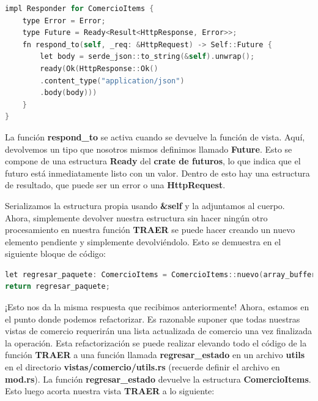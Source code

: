 \begin{lstlisting}[language=C]
impl Responder for ComercioItems {
	type Error = Error;
	type Future = Ready<Result<HttpResponse, Error>>;
	fn respond_to(self, _req: &HttpRequest) -> Self::Future {
		let body = serde_json::to_string(&self).unwrap();
		ready(Ok(HttpResponse::Ok()
		.content_type("application/json")
		.body(body)))
	}
}

\end{lstlisting}

La función \textbf{respond\_to} se activa cuando se devuelve la función de vista. Aquí, devolvemos un tipo que nosotros mismos definimos llamado \textbf{Future}. Esto se compone de una estructura \textbf{Ready} del \textbf{crate de futuros}, lo que indica que el futuro está inmediatamente listo con un valor. Dentro de esto hay una estructura de resultado, que puede ser un error o una \textbf{HttpRequest}.

Serializamos la estructura propia usando \textbf{\&self} y la adjuntamos al cuerpo. Ahora, simplemente devolver nuestra estructura sin hacer ningún otro procesamiento en nuestra función \textbf{TRAER} se puede hacer creando un nuevo elemento pendiente y simplemente devolviéndolo. Esto se demuestra en el siguiente bloque de código:

\begin{lstlisting}[language=C]
let regresar_paquete: ComercioItems = ComercioItems::nuevo(array_buffer);
return regresar_paquete;
\end{lstlisting}

¡Esto nos da la misma respuesta que recibimos anteriormente! Ahora, estamos en el punto donde podemos refactorizar. Es razonable suponer que todas nuestras vistas de comercio requerirán una lista actualizada de comercio una vez finalizada la operación. Esta refactorización se puede realizar elevando todo el código de la función \textbf{TRAER} a una función llamada \textbf{regresar\_estado} en un archivo \textbf{utils} en el directorio \textbf{vistas/comercio/utils.rs} (recuerde definir el archivo en \textbf{mod.rs}). La función \textbf{regresar\_estado} devuelve la estructura \textbf{ComercioItems}. Esto luego acorta nuestra vista \textbf{TRAER} a lo siguiente:



